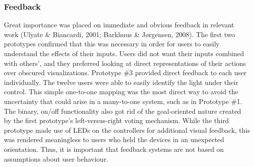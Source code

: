 
\subsubsection{Feedback}

Great importance was placed on immediate and obvious feedback in relevant work (Ulyate \& Biancardi, 2001; Barkhuus \& J{\o}rgensen, 2008). The first two prototypes confirmed that this was necessary in order for users to easily understand the effects of their inputs. Users did not want their inputs combined with others', and they preferred looking at direct representations of their actions over obscured visualizations. Prototype \#3 provided direct feedback to each user individually. The twelve users were able to easily identify the light under their control. This simple one-to-one mapping was the most direct way to avoid the uncertainty that could arise in a many-to-one system, such as in Prototype \#1. The binary, on/off functionality also got rid of the goal-oriented nature created by the first prototype's left-versus-right voting mechanism. While the third prototype made use of LEDs on the controllers for additional visual feedback, this was rendered meaningless to users who held the devices in an unexpected orientation. Thus, it is important that feedback systems are not based on assumptions about user behaviour.

